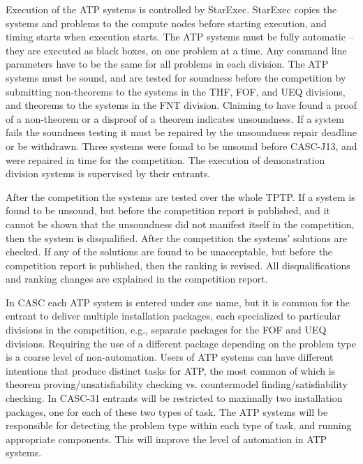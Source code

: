 \documentclass[aic]{iosart2x}
\newcommand{\smalltt}[1]{\small \texttt{#1}}
\newcommand{\THIS}{\mbox{CASC-J13}}
\newcommand{\NEXT}{\mbox{CASC-31}}
\begin{document}

Execution of the ATP systems is controlled by StarExec.
StarExec copies the systems and problems to the compute nodes before starting execution, and timing
starts when execution starts.
The ATP systems must be fully automatic -- they are executed as black boxes, on one problem
at a time.
Any command line parameters have to be the same for all problems in each division.
The ATP systems must be sound, and are tested for soundness before the competition by submitting
non-theorems to the systems in the THF, FOF, and UEQ divisions, and theorems to the systems in the
FNT division.
Claiming to have found a proof of a non-theorem or a disproof of a theorem indicates unsoundness.
If a system fails the soundness testing it must be repaired by the unsoundness repair
deadline or be withdrawn.
Three systems were found to be unsound before \THIS{}, and were repaired in time for the 
competition.
The execution of demonstration division systems is supervised by their entrants.

After the competition the systems are tested over the whole TPTP.
If a system is found to be unsound, but before the competition report is published, and it cannot
be shown that the unsoundness did not manifest itself in the competition, then the system is
disqualified.
After the competition the systems' solutions are checked.
If any of the solutions are found to be unacceptable, but before the competition report is
published, then the ranking is revised.
All disqualifications and ranking changes are explained in the competition report.

In CASC each ATP system is entered under one name, but it is common for the entrant to deliver
multiple installation packages, each specialized to particular divisions in the competition,
e.g., separate packages for the FOF and UEQ divisions.
Requiring the use of a different package depending on the problem type is a coarse level of 
non-automation.
Users of ATP systems can have different intentions that produce distinct tasks for ATP, the
most common of which is theorem proving/unsatisfiability checking vs. countermodel 
finding/satisfiability checking.
In \NEXT{} entrants will be restricted to maximally two installation packages, one for each
of these two types of task.
The ATP systems will be responsible for detecting the problem type within each type of task,
and running appropriate components.
This will improve the level of automation in ATP systems.
\end{document}
